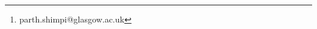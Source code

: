 \documentclass[10pt]{article}
\title{}
\author[1]{Parth Shimpi\footnote{parth.shimpi@glasgow.ac.uk}}
\affil[1]{University of Glasgow}
\begin{document}
 

\maketitle

\begin{abstract}
\end{abstract}

\tableofcontents
\end{document}
